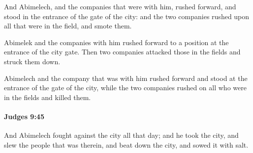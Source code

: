 			\begin{versebox}
					\item[BHS] 
					\item[ASV] And Abimelech, and the companies that were with him, rushed forward, and stood in the entrance of the gate of the city: and the two companies rushed upon all that were in the field, and smote them.
					\item[NIV] Abimelek and the companies with him rushed forward to a position at the entrance of the city gate. Then two companies attacked those in the fields and struck them down.
					\item[NRSV] Abimelech and the company that was with him rushed forward and stood at the entrance of the gate of the city, while the two companies rushed on all who were in the fields and killed them.
			\end{versebox}

		\paragraph{Judges 9:45} %
			\label{JUDGES-9-45}

			And Abimelech fought against the city all that day; and he took the city, and slew the people that was therein, and beat down the city, and sowed it with salt.

